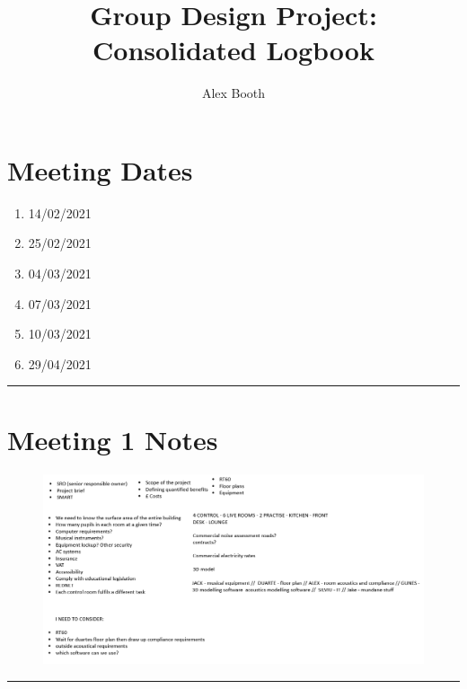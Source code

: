 \documentclass[11pt]{article}
\title{Group Design Project: Consolidated Logbook}
\author{Alex Booth}
\begin{document}
    \maketitle
    \newpage

    \section{Meeting Dates}
        \begin{enumerate}
            \item 14/02/2021
            \item 25/02/2021
            \item 04/03/2021
            \item 07/03/2021
            \item 10/03/2021
            \item 29/04/2021
        \end{enumerate}
        \hrule
    
    \section{Meeting 1 Notes}
        \begin{figure}[H]
            \centering
            \includegraphics[scale=0.325]{resources/M1Notes.png}
        \end{figure}
        \hrule
        \vspace{0.5cm}
\end{document}
